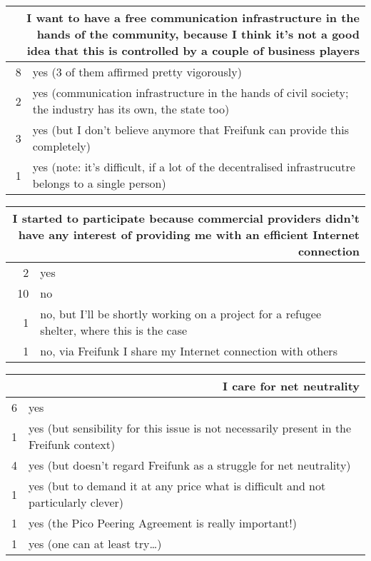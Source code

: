 \begin{table}[h]
  \begin{tabular}{| r | p{\textwidth} |}
    \hline
    \multicolumn{2}{|p{\textwidth}|}{I want to have a free communication infrastructure in the hands of the community, because I think it's not a good idea that this is controlled by a couple of business players} \\
    \hline
    8 & yes (3 of them affirmed pretty vigorously) \\
    2 & yes (communication infrastructure in the hands of civil society; the industry has its own, the state too) \\
    3 & yes (but I don't believe anymore that Freifunk can provide this completely) \\
    1 & yes (note: it's difficult, if a lot of the decentralised infrastrucutre belongs to a single person) \\
    \hline
  \end{tabular}
\end{table}

\begin{table}[h]
  \begin{tabular}{| r | p{\textwidth} |}
    \hline
    \multicolumn{2}{|p{\textwidth}|}{I started to participate because commercial providers didn't have any interest of providing me with an efficient Internet connection} \\
    \hline
    2  & yes \\
    10 & no \\
    1  & no, but I'll be shortly working on a project for a refugee shelter, where this is the case \\
    1  & no, via Freifunk I share my Internet connection with others \\
    \hline
  \end{tabular}
\end{table}

\begin{table}[h]
  \begin{tabular}{| r | p{\textwidth} |}
    \hline
    \multicolumn{2}{|p{\textwidth}|}{I care for net neutrality} \\
    \hline
    6 & yes \\
    1 & yes (but sensibility for this issue is not necessarily present in the Freifunk context) \\
    4 & yes (but doesn't regard Freifunk as a struggle for net neutrality) \\
    1 & yes (but to demand it at any price what is difficult and not particularly clever) \\
    1 & yes (the Pico Peering Agreement is really important!) \\
    1 & yes (one can at least try\ldots) \\
    \hline
  \end{tabular}
\end{table}

